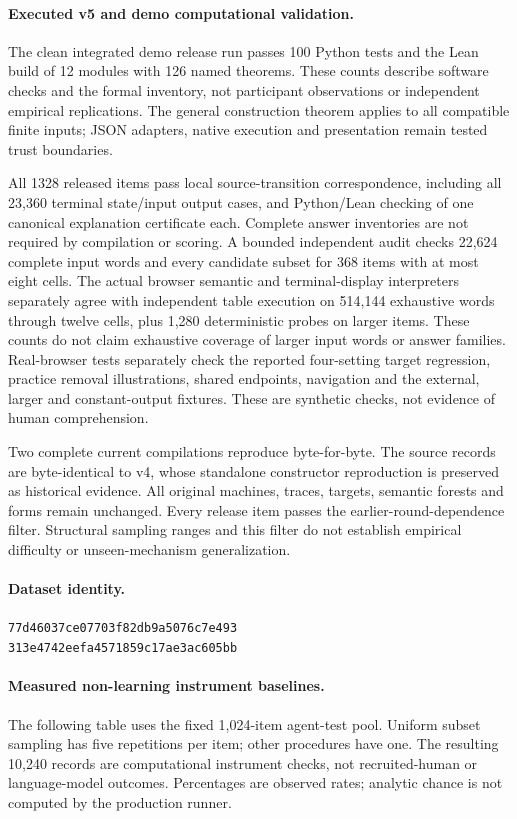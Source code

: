 \paragraph{Executed v5 and demo computational validation.}

The clean integrated demo release run passes 100 Python tests and the Lean build of 12 modules with 126 named theorems. These counts describe software checks and the formal inventory, not participant observations or independent empirical replications. The general construction theorem applies to all compatible finite inputs; JSON adapters, native execution and presentation remain tested trust boundaries.

All 1328 released items pass local source-transition correspondence, including all 23,360 terminal state/input output cases, and Python/Lean checking of one canonical explanation certificate each. Complete answer inventories are not required by compilation or scoring. A bounded independent audit checks 22,624 complete input words and every candidate subset for 368 items with at most eight cells. The actual browser semantic and terminal-display interpreters separately agree with independent table execution on 514,144 exhaustive words through twelve cells, plus 1,280 deterministic probes on larger items. These counts do not claim exhaustive coverage of larger input words or answer families. Real-browser tests separately check the reported four-setting target regression, practice removal illustrations, shared endpoints, navigation and the external, larger and constant-output fixtures. These are synthetic checks, not evidence of human comprehension.

Two complete current compilations reproduce byte-for-byte. The source records are byte-identical to v4, whose standalone constructor reproduction is preserved as historical evidence. All original machines, traces, targets, semantic forests and forms remain unchanged. Every release item passes the earlier-round-dependence filter. Structural sampling ranges and this filter do not establish empirical difficulty or unseen-mechanism generalization.

\paragraph{Dataset identity.}\texttt{\small 77d46037ce07703f82db9a5076c7e493}\\\texttt{\small 313e4742eefa4571859c17ae3ac605bb}

\paragraph{Measured non-learning instrument baselines.}
The following table uses the fixed 1,024-item agent-test pool. Uniform subset sampling has five repetitions per item; other procedures have one. The resulting 10,240 records are computational instrument checks, not recruited-human or language-model outcomes. Percentages are observed rates; analytic chance is not computed by the production runner.

